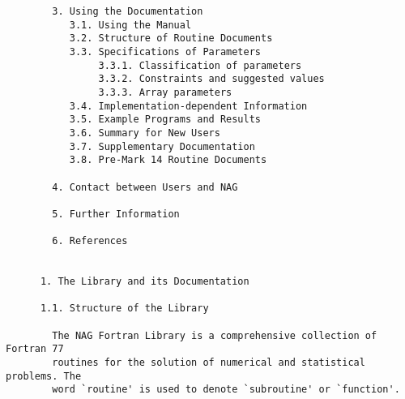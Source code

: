 \begin{small}
\begin{verbatim}
        3. Using the Documentation                                                
           3.1. Using the Manual                                                  
           3.2. Structure of Routine Documents                                    
           3.3. Specifications of Parameters                                      
                3.3.1. Classification of parameters                               
                3.3.2. Constraints and suggested values                           
                3.3.3. Array parameters                                           
           3.4. Implementation-dependent Information                              
           3.5. Example Programs and Results                                      
           3.6. Summary for New Users                                             
           3.7. Supplementary Documentation                                       
           3.8. Pre-Mark 14 Routine Documents                                     
                                                                                  
        4. Contact between Users and NAG                                          
                                                                                  
        5. Further Information                                                    
                                                                                  
        6. References                                                             
                                                                                  
                                                                                  
      1. The Library and its Documentation                                        
                                                                                  
      1.1. Structure of the Library                                               
                                                                                  
        The NAG Fortran Library is a comprehensive collection of Fortran 77       
        routines for the solution of numerical and statistical problems. The      
        word `routine' is used to denote `subroutine' or `function'.              
                                                                                  

\end{verbatim}
\end{small}
